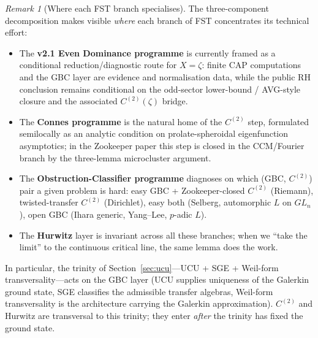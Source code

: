\documentclass[11pt]{article}
\theoremstyle{definition}
\theoremstyle{remark}
\newtheorem{remark}[theorem]{Remark}
\begin{document}
\begin{remark}[Where each FST branch specialises]
\label{rem:three-component-specialisation}
The three-component decomposition makes visible \emph{where} each
branch of FST concentrates its technical effort:
\begin{itemize}
\item The \textbf{v2.1 Even Dominance programme}
\cite{Geiger2026RHII} is currently framed as a conditional
reduction/diagnostic route for $X = \zeta$: finite CAP computations
and the GBC layer are evidence and normalisation data, while the public
RH conclusion remains conditional on the odd-sector lower-bound /
AVG-style closure and the associated $C^{(2)}(\zeta)$ bridge.
\item The \textbf{Connes programme}
\cite{Connes2026,ConnesConsaniMoscovici2025} is the natural home of the
$C^{(2)}$ step, formulated semilocally as an analytic condition on
prolate-spheroidal eigenfunction asymptotics; in the Zookeeper paper
this step is closed in the CCM/Fourier branch by the three-lemma
microcluster argument.
\item The \textbf{Obstruction-Classifier programme}
\cite{GeigerObstructionClassifiers} diagnoses on which
(GBC, $C^{(2)}$) pair a given problem is hard: easy GBC +
Zookeeper-closed $C^{(2)}$ (Riemann), twisted-transfer
$C^{(2)}$ (Dirichlet), easy both (Selberg, automorphic
$L$ on $GL_n$), open GBC (Ihara generic, Yang--Lee, $p$-adic
$L$).
\item The \textbf{Hurwitz} layer is invariant across all these
branches; when we ``take the limit'' to the continuous critical
line, the same lemma does the work.
\end{itemize}
In particular, the trinity of Section~\ref{sec:ucu}---UCU + SGE +
Weil-form transversality---acts on the GBC layer (UCU supplies
uniqueness of the Galerkin ground state, SGE classifies the
admissible transfer algebras, Weil-form transversality is the
architecture carrying the Galerkin approximation). $C^{(2)}$ and
Hurwitz are transversal to this trinity; they enter \emph{after}
the trinity has fixed the ground state.
\end{remark}
\end{document}
